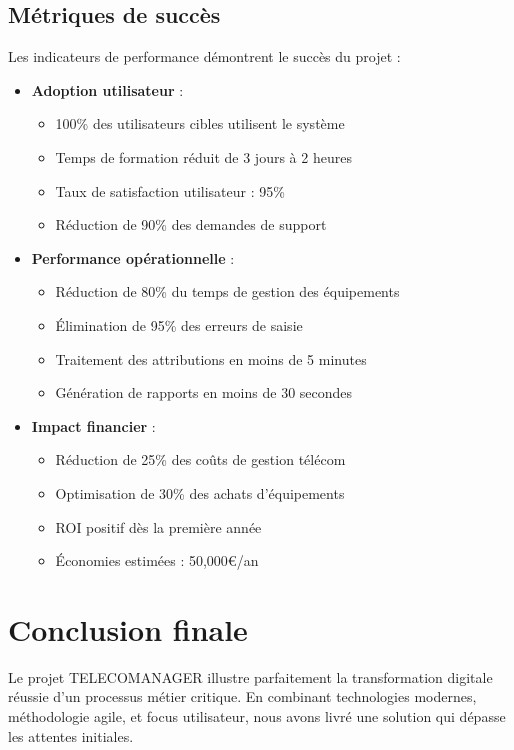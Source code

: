\documentclass[12pt,a4paper]{report}
\begin{document}
\subsection{Métriques de succès}
Les indicateurs de performance démontrent le succès du projet :

\begin{itemize}
\item \textbf{Adoption utilisateur} :
  \begin{itemize}
  \item 100\% des utilisateurs cibles utilisent le système
  \item Temps de formation réduit de 3 jours à 2 heures
  \item Taux de satisfaction utilisateur : 95\%
  \item Réduction de 90\% des demandes de support
  \end{itemize}

\item \textbf{Performance opérationnelle} :
  \begin{itemize}
  \item Réduction de 80\% du temps de gestion des équipements
  \item Élimination de 95\% des erreurs de saisie
  \item Traitement des attributions en moins de 5 minutes
  \item Génération de rapports en moins de 30 secondes
  \end{itemize}

\item \textbf{Impact financier} :
  \begin{itemize}
  \item Réduction de 25\% des coûts de gestion télécom
  \item Optimisation de 30\% des achats d'équipements
  \item ROI positif dès la première année
  \item Économies estimées : 50,000€/an
  \end{itemize}
\end{itemize}

\section{Conclusion finale}
Le projet TELECOMANAGER illustre parfaitement la transformation digitale réussie d'un processus métier critique. En combinant technologies modernes, méthodologie agile, et focus utilisateur, nous avons livré une solution qui dépasse les attentes initiales.
\end{document}
